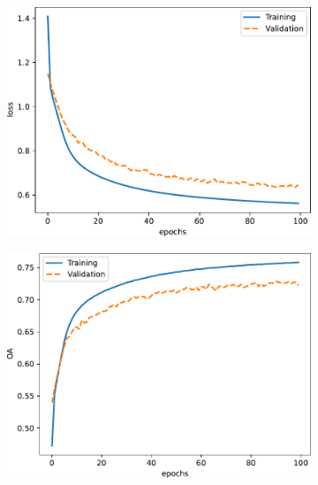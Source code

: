 \documentclass[journal,article,submit,pdftex,moreauthors]{Definitions/mdpi}
\begin{document}
\begin{figure}[H]
	\centering
	\begin{subfigure}[t]{0.3\linewidth}
		\centering
		\includegraphics[width=\linewidth]{figures/classification_results/fcn_loss.pdf}
	  \caption{}
	  \label{fig:fcn_loss}
	\end{subfigure}
	\begin{subfigure}[t]{0.3\linewidth}
		\centering
		\includegraphics[width=\linewidth]{figures/classification_results/fcn_accuracy.pdf}
	\caption{}
	\label{fig:fcn_accuracy}
	\end{subfigure}
	\begin{subfigure}[t]{0.3\linewidth}
		\centering

\end{subfigure}
\end{figure}
\end{document}
